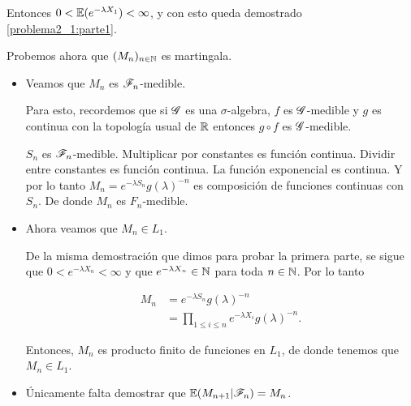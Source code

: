     Entonces $0 < \mathbb{E}(e^{-\lambda X_1}) < \infty$, y con esto queda demostrado \eqref{problema2_1:parte1}.\pn
    
    Probemos ahora que $(M_n)_{n \in \mathbb{N}}$ es martingala.
    
    \begin{itemize}
        \item 
            Veamos que $M_n$ es $\mathscr{F}_n$-medible.\pn
            
            Para esto, recordemos que si $\mathscr{G}$ es una $\sigma$-algebra, $f$ es $\mathscr{G}$-medible y $g$ es continua
            con la topología usual de $\mathbb{R}$ entonces $g \circ f$ es $\mathscr{G}$-medible.\pn
            
            $S_n$ es $\mathscr{F}_n$-medible. Multiplicar por constantes es función continua. Dividir entre constantes 
            es función continua. La función exponencial es continua. Y por lo tanto $M_n=e^{-\lambda S_n}g(\lambda)^{-n}$ 
            es composición de funciones continuas con $S_n$. De donde $M_n$ es $F_n$-medible.\pn
         
        \item 
            Ahora veamos que $M_n \in L_1$.\pn
            
            De la misma demostración que dimos para probar la primera parte, se sigue 
            que $0 < e^{-\lambda X_n} < \infty$ y que $e^{-\lambda X_n} \in \mathbb{N}$ para toda $n \in \mathbb{N}$. Por lo tanto
            
            \begin{align}
                M_n         &=      e^{-\lambda S_n}g(\lambda)^{-n} \\
                            &=      \prod_{1 \leq i \leq n} e^{-\lambda X_i} g(\lambda)^{-n}. 
            \end{align}\pn
            
            Entonces, $M_n$ es producto finito de funciones en $L_1$, de donde tenemos que $M_n \in L_1$.\pn
            
         \item
            Únicamente falta demostrar que $\mathbb{E}(M_{n+1} | \mathscr{F}_n) = M_n$.\pn
            

\end{itemize}
